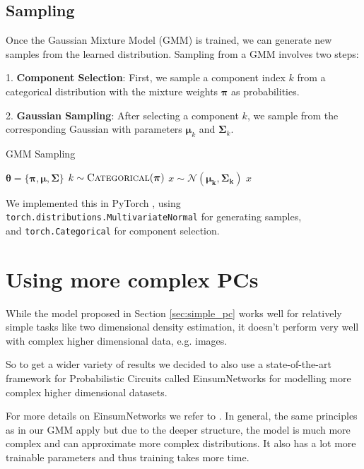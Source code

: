 \subsection{Sampling}
\label{sec:gmm_sampling}

Once the Gaussian Mixture Model (GMM) is trained, we can generate new samples from the learned distribution. Sampling from a GMM involves two steps:

1. \textbf{Component Selection}: First, we sample a component index $k$ from a categorical distribution with the mixture weights $\boldsymbol{\pi}$ as probabilities.
   
2. \textbf{Gaussian Sampling}: After selecting a component $k$, we sample from the corresponding Gaussian with parameters $\boldsymbol{\mu}_k$ and $\boldsymbol{\Sigma}_k$. 

\begin{algorithm}
    \caption{GMM Sampling}
    \label{alg:gmm_sampling}
    \begin{algorithmic}[1]  
        \Require $\boldsymbol{\theta} = \{\boldsymbol{\pi}, \boldsymbol{\mu}, \boldsymbol{\Sigma}\}$
            \State $ k \sim \textsc{Categorical}(\boldsymbol{\pi})$
            \State $ x \sim \mathcal{N}(\boldsymbol{\mu_k}, \boldsymbol{\Sigma_k})$
        \State \Return $x$
    \end{algorithmic}
\end{algorithm}

We implemented this in PyTorch \cite{pytorch}, using \\
\texttt{torch.distributions.MultivariateNormal} for generating samples,\\
and \texttt{torch.Categorical} for component selection.

\section{Using more complex PCs}

While the model proposed in Section \ref{sec:simple_pc} works well for relatively simple tasks like two dimensional density estimation,
it doesn't perform very well with complex higher dimensional data, e.g. images. 

So to get a wider variety of results we decided to also use a state-of-the-art framework for Probabilistic Circuits called 
EinsumNetworks \cite{einsum} for modelling more complex higher dimensional datasets. 

For more details on EinsumNetworks we refer to \cite{einsum}. In general, the same 
principles as in our GMM apply but due to the deeper structure, the model is much more complex and can approximate more complex distributions. 
It also has a lot more trainable parameters and thus training takes more time. 

